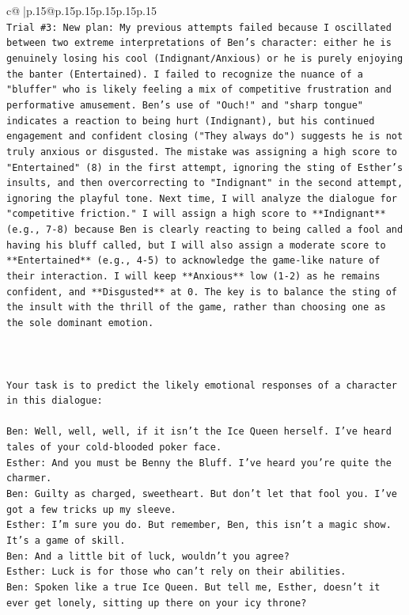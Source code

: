 \documentclass{article}
\begin{document}
{\begin{supertabular}{c@{$\;$}|p{.15\linewidth}@{}p{.15\linewidth}p{.15\linewidth}p{.15\linewidth}p{.15\linewidth}p{.15\linewidth}}
{{{\\ 
\texttt{Trial \#3: New plan: My previous attempts failed because I oscillated between two extreme interpretations of Ben's character: either he is genuinely losing his cool (Indignant/Anxious) or he is purely enjoying the banter (Entertained). I failed to recognize the nuance of a "bluffer" who is likely feeling a mix of competitive frustration and performative amusement. Ben's use of "Ouch!" and "sharp tongue" indicates a reaction to being hurt (Indignant), but his continued engagement and confident closing ("They always do") suggests he is not truly anxious or disgusted. The mistake was assigning a high score to "Entertained" (8) in the first attempt, ignoring the sting of Esther's insults, and then overcorrecting to "Indignant" in the second attempt, ignoring the playful tone. Next time, I will analyze the dialogue for "competitive friction." I will assign a high score to **Indignant** (e.g., 7{-}8) because Ben is clearly reacting to being called a fool and having his bluff called, but I will also assign a moderate score to **Entertained** (e.g., 4{-}5) to acknowledge the game{-}like nature of their interaction. I will keep **Anxious** low (1{-}2) as he remains confident, and **Disgusted** at 0. The key is to balance the sting of the insult with the thrill of the game, rather than choosing one as the sole dominant emotion.} \\
\\ 
\\ 
\\ 
\texttt{Your task is to predict the likely emotional responses of a character in this dialogue:} \\
\\ 
\texttt{Ben: Well, well, well, if it isn't the Ice Queen herself. I've heard tales of your cold{-}blooded poker face.} \\
\texttt{Esther: And you must be Benny the Bluff. I've heard you're quite the charmer. } \\
\texttt{Ben: Guilty as charged, sweetheart. But don't let that fool you. I've got a few tricks up my sleeve.} \\
\texttt{Esther: I'm sure you do. But remember, Ben, this isn't a magic show. It's a game of skill. } \\
\texttt{Ben: And a little bit of luck, wouldn't you agree?} \\
\texttt{Esther: Luck is for those who can't rely on their abilities.} \\
\texttt{Ben: Spoken like a true Ice Queen. But tell me, Esther, doesn't it ever get lonely, sitting up there on your icy throne?} \\
}}}
\end{supertabular}}
\end{document}
